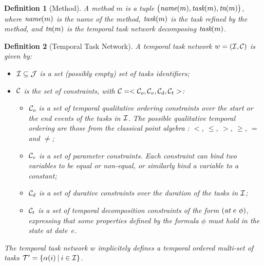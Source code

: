 \documentclass[letterpaper]{article} %
\newtheorem{definition}{Definition}
\newcommand{\at}{\text{\it at}}
\newcommand{\name}{\text{\it name}}
\newcommand{\task}{\text{\it task}}
\newcommand{\tn}{\text{\it tn}}
\begin{document}
\begin{definition}[Method]\label{def:met}
A \emph{method} $m$ is a tuple $\bigl(\name(m), \task(m), \tn(m)\bigr)$, where $\name(m)$ is the name of the method, $\task(m)$ is the task refined by the method, and $\tn(m)$ is the temporal task network decomposing $\task(m)$. %
\end{definition}



\begin{definition}[Temporal Task Network]\label{def:TNN}
A \emph{temporal task network} $w = ({\cal{I}}, {\cal{C}})$ is given by: %
\begin{itemize}

    \item $\cal{I} \subseteq \cal{J}$ is a set (possibly empty) set of tasks identifiers;

    \item $\cal{C}$ is the set of constraints, with ${\cal{C}} = < {\cal{C}}_o, {\cal{C}}_v, {\cal{C}}_d, {\cal{C}}_t >$:
      \begin{itemize}
      \item ${\cal{C}}_o$ is a set of temporal qualitative ordering constraints over the start or the end events of the tasks in $\cal{I}$. The possible qualitative temporal ordering are those from the classical point algebra \cite{broxvall03}: $<$, $\leq$, $>$, $\geq$, $=$ and $\neq$;

      \item ${\cal{C}}_v$ is a set of parameter constraints. Each constraint can bind two variables to be equal or non-equal, or similarly bind a variable to a constant; %

      \item ${\cal{C}}_d$ is a set of durative constraints over the duration of the tasks in $\cal{I}$;

      \item ${\cal{C}}_t$ is a set of temporal decomposition constraints of the form $(\at \ e \ \phi)$, expressing that some properties defined by the %
        formula $\phi$ must hold in the state at \mbox{date $e$.}
      \end{itemize}
\end{itemize}
The temporal task network $w$ implicitely defines a temporal ordered multi-set of tasks ${\cal{T}}' = \{ \alpha(i) \: | \: i \in {\cal{I}} \}$.
\end{definition}
\end{document}
